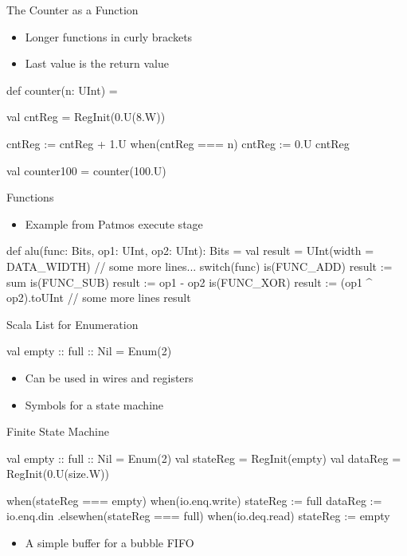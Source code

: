 \begin{frame}[fragile]{The Counter as a Function}
\begin{itemize}
\item Longer functions in curly brackets
\item Last value is the return value
\end{itemize}
\begin{chisel}
def counter(n: UInt) = {
  
  val cntReg = RegInit(0.U(8.W))
  
  cntReg := cntReg + 1.U
  when(cntReg === n) {
    cntReg := 0.U
  }
  cntReg
}

val counter100 = counter(100.U)
\end{chisel}
\end{frame}


\begin{frame}[fragile]{Functions}
\begin{itemize}
\item Example from Patmos execute stage
\end{itemize}
\begin{chisel}
def alu(func: Bits, op1: UInt, op2: UInt): Bits = {
  val result = UInt(width = DATA_WIDTH)
  // some more lines...
  switch(func) {
    is(FUNC_ADD) { result := sum }
    is(FUNC_SUB) { result := op1 - op2 }
    is(FUNC_XOR) { result := (op1 ^ op2).toUInt }
    // some more lines
  }
  result
}
\end{chisel}
\end{frame}

\begin{frame}[fragile]{Scala List for Enumeration}
\begin{chisel}
  val empty :: full :: Nil = Enum(2)
\end{chisel}
\begin{itemize}
\item Can be used in wires and registers
\item Symbols for a state machine
\end{itemize}
\end{frame}

\begin{frame}[fragile]{Finite State Machine}
\begin{chisel}
  val empty :: full :: Nil = Enum(2)
  val stateReg = RegInit(empty)
  val dataReg = RegInit(0.U(size.W))

  when(stateReg === empty) {
    when(io.enq.write) {
      stateReg := full
      dataReg := io.enq.din
    }
  }.elsewhen(stateReg === full) {
    when(io.deq.read) {
      stateReg := empty
    }
  }
\end{chisel}
\begin{itemize}
\item A simple buffer for a bubble FIFO
\end{itemize}
\end{frame}

